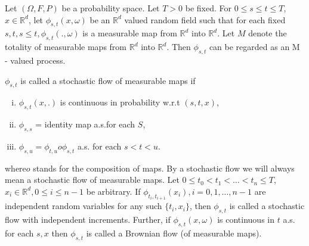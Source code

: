   Let $(\Omega,  F, P)$ be a probability space. Let $T > 0$ be
  fixed. For $0 \le s \le t \le T$,  $x \in \mathbb{R}^d$, let
  $\phi_{s,t}(x, \omega)$ be an $\mathbb{R}^d$ valued random field
  such that for each fixed $s, t, s \le t, \phi_{s,t}(., \omega)$ is a
  measurable map from $\mathbb{R}^d$ into $\mathbb{R}^d$. Let $M$
  denote the totality of measurable maps from $\mathbb{R}^d$ into
  $\mathbb{R}^d$. Then $\phi_{s,t}$ can be regarded as an M - valued
  process. 

  \begin{definition}\label{c1:def1.1.1} %
    $\phi_{s,t}$ is called a stochastic flow of measurable maps if 
    \begin{enumerate}[(i)]
    \item $\phi_{s,t}(x,.)$ is continuous in probability w.r.t $(s,t,x)$,
    \item $\phi_{s,s}$ = identity map a.s.for each $S$,
    \item $\phi_{s,u} = \phi_{t,u} o \phi_{s,t}$ a.s. for each $s < t < u$.
    \end{enumerate}
  \end{definition}  
  where\pageoriginale $o$ stands for the composition of maps. By a stochastic flow
  we will always mean a stochastic flow of measurable maps. Let $0 \le
  t_0 < t_1 < \ldots < t_n \le T$, $x_i \in \mathbb{R}^d, 0 \le
  i \le n-1$ be arbitrary. If $\phi_{t_i,t_{i+1}}(x_i), i = 0, 1,
  \ldots,  n-1$ are independent random variables for any such $\{
  t_i, x_i \}$, then $\phi_{s,t}$ is called a stochastic flow with
  independent increments. Further, if $\phi_{s,t}(x, \omega)$ is
  continuous in $t$ a.s. for each $s,x$ then $\phi_{s,t}$ is called a
  Brownian flow (of measurable maps). 
  
